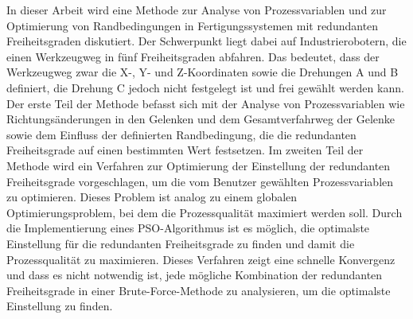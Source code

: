 {%
	In dieser Arbeit wird eine Methode zur Analyse von Prozessvariablen und zur Optimierung von Randbedingungen in Fertigungssystemen mit redundanten Freiheitsgraden diskutiert. Der Schwerpunkt liegt dabei auf Industrierobotern, die einen Werkzeugweg in fünf Freiheitsgraden abfahren. Das bedeutet, dass der Werkzeugweg zwar die X-, Y- und Z-Koordinaten sowie die Drehungen A und B definiert, die Drehung C jedoch nicht festgelegt ist und frei gewählt werden kann. Der erste Teil der Methode befasst sich mit der Analyse von Prozessvariablen wie Richtungsänderungen in den Gelenken und dem Gesamtverfahrweg der Gelenke sowie dem Einfluss der definierten Randbedingung, die die redundanten Freiheitsgrade auf einen bestimmten Wert festsetzen.
	Im zweiten Teil der Methode wird ein Verfahren zur Optimierung der Einstellung der redundanten Freiheitsgrade vorgeschlagen, um die vom Benutzer gewählten Prozessvariablen zu optimieren. Dieses Problem ist analog zu einem globalen Optimierungsproblem, bei dem die Prozessqualität maximiert werden soll. Durch die Implementierung eines \acrshort{PSO}-Algorithmus ist es möglich, die optimalste Einstellung für die redundanten Freiheitsgrade zu finden und damit die Prozessqualität zu maximieren. Dieses Verfahren zeigt eine schnelle Konvergenz und dass es nicht notwendig ist, jede mögliche Kombination der redundanten Freiheitsgrade in einer Brute-Force-Methode zu analysieren, um die optimalste Einstellung zu finden.
}%
%
%
